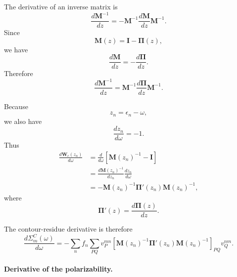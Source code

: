 The derivative of an inverse matrix is
\begin{equation}
    \frac{d\mathbf M^{-1}}{dz}
    =
    -\mathbf M^{-1}
    \frac{d\mathbf M}{dz}
    \mathbf M^{-1}.
\end{equation}
Since
\begin{equation}
    \mathbf M(z)
    =
    \mathbf I-\boldsymbol{\Pi}(z),
\end{equation}
we have
\begin{equation}
    \frac{d\mathbf M}{dz}
    =
    -\frac{d\boldsymbol{\Pi}}{dz}.
\end{equation}
Therefore
\begin{equation}
    \frac{d\mathbf M^{-1}}{dz}
    =
    \mathbf M^{-1}
    \frac{d\boldsymbol{\Pi}}{dz}
    \mathbf M^{-1}.
\end{equation}

Because
\begin{equation}
    z_n=\epsilon_n-\omega,
\end{equation}
we also have
\begin{equation}
    \frac{d z_n}{d\omega}=-1.
\end{equation}
Thus
\begin{align}
    \frac{d\mathbf W_c(z_n)}{d\omega}
    &=
    \frac{d}{d\omega}
    \left[
    \mathbf M(z_n)^{-1}
    -
    \mathbf I
    \right] \\
    &=
    \frac{d\mathbf M(z_n)^{-1}}{dz_n}
    \frac{d z_n}{d\omega} \\
    &=
    -
    \mathbf M(z_n)^{-1}
    \boldsymbol{\Pi}'(z_n)
    \mathbf M(z_n)^{-1},
\end{align}
where
\begin{equation}
    \boldsymbol{\Pi}'(z)
    =
    \frac{d\boldsymbol{\Pi}(z)}{dz}.
\end{equation}

The contour-residue derivative is therefore
\begin{equation}
    \boxed{
    \frac{d\Sigma_m^C(\omega)}{d\omega}
    =
    -
    \sum_n f_n
    \sum_{PQ}
    v_P^{mn}
    \left[
    \mathbf M(z_n)^{-1}
    \boldsymbol{\Pi}'(z_n)
    \mathbf M(z_n)^{-1}
    \right]_{PQ}
    v_Q^{nm}
    }.
\end{equation}

\paragraph{Derivative of the polarizability.}

